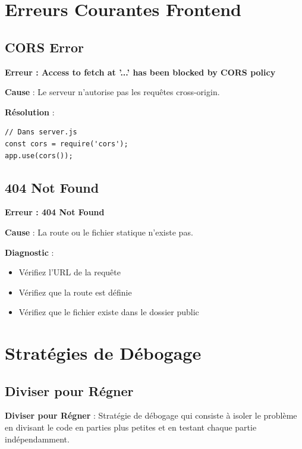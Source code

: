 \section{Erreurs Courantes Frontend}

\subsection{CORS Error}

\begin{errorbox}
    \textbf{Erreur : Access to fetch at '...' has been blocked by CORS policy}
    
    \textbf{Cause} : Le serveur n'autorise pas les requêtes cross-origin.
    
    \textbf{Résolution} :
    \begin{lstlisting}[style=javascript]
// Dans server.js
const cors = require('cors');
app.use(cors());
    \end{lstlisting}
\end{errorbox}

\subsection{404 Not Found}

\begin{errorbox}
    \textbf{Erreur : 404 Not Found}
    
    \textbf{Cause} : La route ou le fichier statique n'existe pas.
    
    \textbf{Diagnostic} :
    \begin{itemize}
        \item Vérifiez l'URL de la requête
        \item Vérifiez que la route est définie
        \item Vérifiez que le fichier existe dans le dossier public
    \end{itemize}
\end{errorbox}

\section{Stratégies de Débogage}

\subsection{Diviser pour Régner}

\begin{definitionbox}
    \textbf{Diviser pour Régner} : Stratégie de débogage qui consiste à isoler le problème en divisant le code en parties plus petites et en testant chaque partie indépendamment.
\end{definitionbox}

